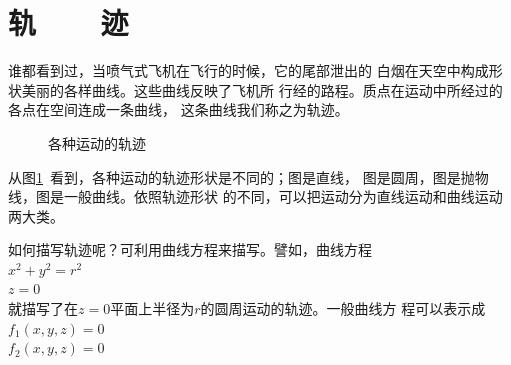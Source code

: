 \section[轨迹]{轨~~~~迹}\label{sec:01.05}

谁都看到过，当喷气式飞机在飞行的时候，它的尾部泄出的
白烟在天空中构成形状美丽的各样曲线。这些曲线反映了飞机所
行经的路程。质点在运动中所经过的各点在空间连成一条曲线，
这条曲线我们称之为轨迹。

\begin{figure}[!h]
    \hspace{3em}
    \hspace{3em}

    \hspace{3.7em}
    \hspace{1.3em}
    \caption{各种运动的轨迹}
    \label{fig:01.06}
\end{figure}
从图\ref{fig:01.06}~看到，各种运动的轨迹形状是不同的；图是直线，
图是圆周，图是抛物线，图是一般曲线。依照轨迹形状
的不同，可以把运动分为直线运动和曲线运动两大类。

如何描写轨迹呢？可利用曲线方程来描写。譬如，曲线方程 \\ \null\hspace{6em}  $x^2+y^2=r^2$ \vspace{-0.1em}\\
   \null\hspace{6em}  $z=0$ \\
就描写了在$z=0$平面上半径为$r$的圆周运动的轨迹。一般曲线方
程可以表示成 \\
    \null\hspace{6em} $f_1(x,y,z)=0$ \vspace{-0.1em}\\
    \null\hspace{6em} $f_2(x,y,z)=0$

